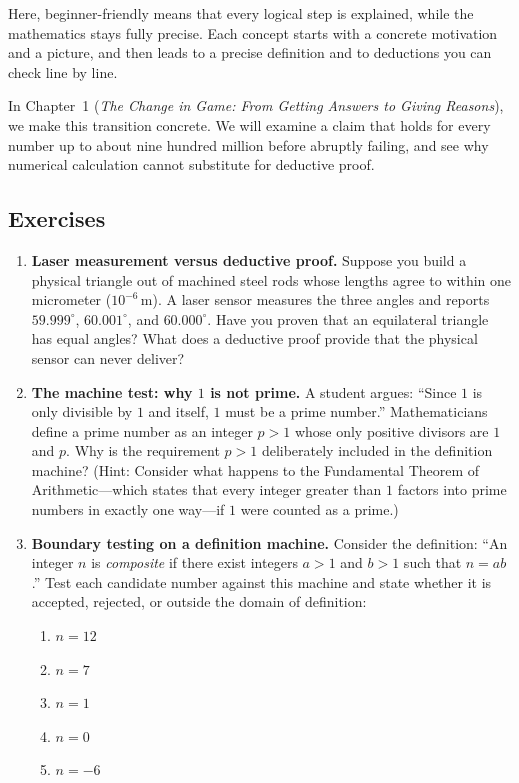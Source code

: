 Here, beginner-friendly means that every logical step is explained, while the mathematics stays fully precise. Each concept starts with a concrete motivation and a picture, and then leads to a precise definition and to deductions you can check line by line.

In Chapter~1 (\emph{The Change in Game: From Getting Answers to Giving Reasons}), we make this transition concrete. We will examine a claim that holds for every number up to about nine hundred million before abruptly failing, and see why numerical calculation cannot substitute for deductive proof.

\subsection*{Exercises}

\begin{enumerate}
\item \textbf{Laser measurement versus deductive proof.} Suppose you build a physical triangle out of machined steel rods whose lengths agree to within one micrometer ($10^{-6}\,\text{m}$). A laser sensor measures the three angles and reports $59.999^\circ$, $60.001^\circ$, and $60.000^\circ$. Have you proven that an equilateral triangle has equal angles? What does a deductive proof provide that the physical sensor can never deliver?

\item \textbf{The machine test: why $1$ is not prime.} A student argues: ``Since $1$ is only divisible by $1$ and itself, $1$ must be a prime number.'' Mathematicians define a prime number as an integer $p > 1$ whose only positive divisors are $1$ and $p$. Why is the requirement $p > 1$ deliberately included in the definition machine? (Hint: Consider what happens to the Fundamental Theorem of Arithmetic---which states that every integer greater than $1$ factors into prime numbers in exactly one way---if $1$ were counted as a prime.)

\item \textbf{Boundary testing on a definition machine.} Consider the definition: ``An integer $n$ is \emph{composite} if there exist integers $a > 1$ and $b > 1$ such that $n = ab$.'' Test each candidate number against this machine and state whether it is accepted, rejected, or outside the domain of definition:
\begin{enumerate}[label=(\alph*)]
\item $n = 12$
\item $n = 7$
\item $n = 1$
\item $n = 0$
\item $n = -6$
\end{enumerate}


\end{enumerate}
